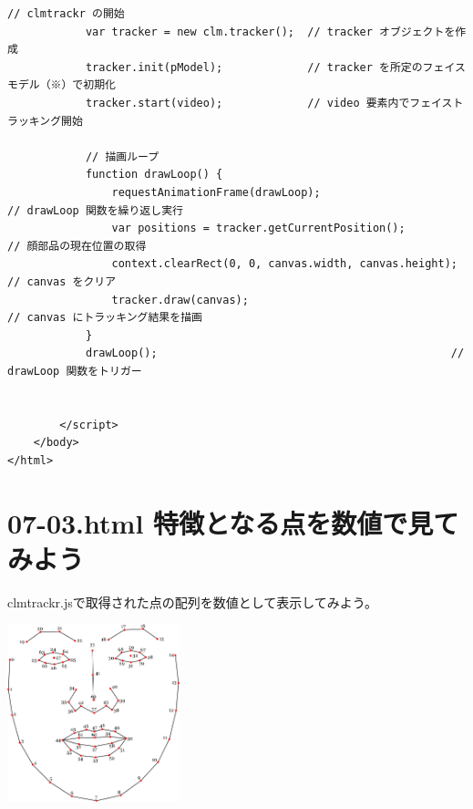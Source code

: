 \documentclass[mingoth,11pt,a4j,uplatex]{jsarticle}
\begin{document}
\begin{lstlisting}[caption=07-02.html]
            // clmtrackr の開始
            var tracker = new clm.tracker();  // tracker オブジェクトを作成
            tracker.init(pModel);             // tracker を所定のフェイスモデル（※）で初期化
            tracker.start(video);             // video 要素内でフェイストラッキング開始

            // 描画ループ
            function drawLoop() {
                requestAnimationFrame(drawLoop);                      // drawLoop 関数を繰り返し実行
                var positions = tracker.getCurrentPosition();         // 顔部品の現在位置の取得
                context.clearRect(0, 0, canvas.width, canvas.height); // canvas をクリア
                tracker.draw(canvas);                                 // canvas にトラッキング結果を描画
            }
            drawLoop();                                             // drawLoop 関数をトリガー
            

        </script>
    </body>
</html>
\end{lstlisting}

\newpage
\section{07-03.html 特徴となる点を数値で見てみよう}
clmtrackr.jsで取得された点の配列を数値として表示してみよう。

\vspace{1em}
\begin{center}
\includegraphics[width=5cm]{img/facemodel_numbering_new.png}
\end{center}
\end{document}
